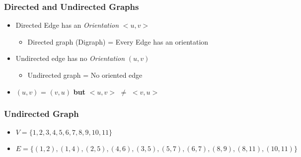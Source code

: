 \documentclass[newPxFont,sthlmFooter,nooffset]{beamer}
\begin{document}
\begin{frame}[t]
  \frametitle{Directed and Undirected Graphs}
  \begin{itemize}
  \item Directed Edge has an \textit{Orientation} $<u, v>$
    \begin{itemize}
    \item Directed graph (Digraph) = Every Edge has an orientation
    \end{itemize}
  \end{itemize}
  \begin{center}
  \end{center}
  \begin{itemize}
  \item Undirected edge has no \textit{Orientation} $(u, v)$
    \begin{itemize}
    \item Undirected graph = No oriented edge
    \end{itemize}
  \end{itemize}
  \begin{center}
  \end{center}
\begin{itemize}
	\item $(u, v)$ = $(v, u)$ \textbf{but} $<u, v>$ $\ne$ $<v, u>$
\end{itemize}
\end{frame}


\begin{frame}[t]
  \frametitle{Undirected Graph}
  \begin{center}
    \hspace{3em}
  \end{center}
  \begin{itemize}
  \item $V=\{1, 2, 3, 4, 5, 6, 7, 8, 9, 10, 11\}$
  \item $E=\{(1, 2), (1, 4), (2, 5), (4, 6), (3, 5), (5, 7), (6, 7), (8, 9), (8, 11), (10, 11)\}$
  \end{itemize}
\end{frame}
\end{document}
